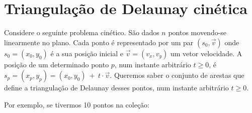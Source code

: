 
\chapter{Triangulação de Delaunay cinética}


Considere o seguinte problema cinético. São dados $n$ pontos movendo-se
linearmente no plano. Cada ponto é representado por um par $(s_0, \vec{v})$ onde
$s_0 = (x_0, y_0)$ é a sua posição inicial e $\vec{v} = (v_x, v_y)$ um vetor
velocidade. A posição de um determinado ponto $p$, num instante arbitrário $t
\geq 0$, é $s_p = (x_p, y_p) = (x_0, y_0)~+~t\cdot \vec{v}$. Queremos saber o
conjunto de arestas que define a triangulação de Delaunay desses pontos, num
instante arbitrário $t \geq 0$.

Por exemplo, se tivermos 10 pontos na coleção: 




